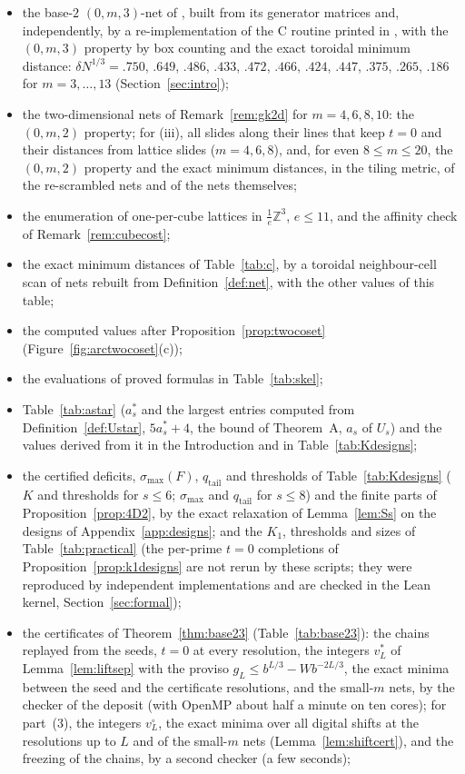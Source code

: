 \documentclass[11pt]{amsart}
\theoremstyle{definition}
\theoremstyle{plain}
\newcommand{\Z}{\mathbb{Z}}
\begin{document}
\begin{itemize}
\item the base-$2$ $(0,m,3)$-net of \cite[Sec.~2]{GK09}, built from its generator matrices and, independently, by a re-implementation of the C routine printed in \cite{GK09}, with the $(0,m,3)$ property by box counting and the exact toroidal minimum distance: $\delta N^{1/3}=.750$, $.649$, $.486$, $.433$, $.472$, $.466$, $.424$, $.447$, $.375$, $.265$, $.186$ for $m=3,\dots,13$ (Section~\ref{sec:intro});
\item the two-dimensional nets of Remark~\ref{rem:gk2d} for $m=4,6,8,10$: the $(0,m,2)$ property; for (iii), all slides along their lines that keep $t=0$ and their distances from lattice slides ($m=4,6,8$), and, for even $8\le m\le20$, the $(0,m,2)$ property and the exact minimum distances, in the tiling metric, of the re-scrambled nets and of the nets themselves;
\item the enumeration of one-per-cube lattices in $\frac1e\Z^3$, $e\le11$, and the affinity check of Remark~\ref{rem:cubecost};
\item the exact minimum distances of Table~\ref{tab:c}, by a toroidal neighbour-cell scan of nets rebuilt from Definition~\ref{def:net}, with the other values of this table;
\item the computed values after Proposition~\ref{prop:twocoset} (Figure~\ref{fig:arctwocoset}(c));
\item the evaluations of proved formulas in Table~\ref{tab:skel};
\item Table~\ref{tab:astar} ($a^*_s$ and the largest entries computed from Definition~\ref{def:Ustar}, $5a^*_s+4$, the bound of Theorem~A, $a_s$ of $U_s$) and the values derived from it in the Introduction and in Table~\ref{tab:Kdesigns};
\item the certified deficits, $\sigma_{\max}(F)$, $q_{\mathrm{tail}}$ and thresholds of Table~\ref{tab:Kdesigns} ($K$ and thresholds for $s\le6$; $\sigma_{\max}$ and $q_{\mathrm{tail}}$ for $s\le8$) and the finite parts of Proposition~\ref{prop:4D2}, by the exact relaxation of Lemma~\ref{lem:Ss} on the designs of Appendix~\ref{app:designs}; and the $K_1$, thresholds and sizes of Table~\ref{tab:practical} (the per-prime $t=0$ completions of Proposition~\ref{prop:k1designs} are not rerun by these scripts; they were reproduced by independent implementations and are checked in the Lean kernel, Section~\ref{sec:formal});
\item the certificates of Theorem~\ref{thm:base23} (Table~\ref{tab:base23}): the chains replayed from the seeds, $t=0$ at every resolution, the integers $v^*_L$ of Lemma~\ref{lem:liftsep} with the proviso $g_L\le b^{L/3}-Wb^{-2L/3}$, the exact minima between the seed and the certificate resolutions, and the small-$m$ nets, by the checker of the deposit (with OpenMP about half a minute on ten cores); for part~(3), the integers $v^\circ_L$, the exact minima over all digital shifts at the resolutions up to $L$ and of the small-$m$ nets (Lemma~\ref{lem:shiftcert}), and the freezing of the chains, by a second checker (a few seconds);

\end{itemize}
\end{document}
